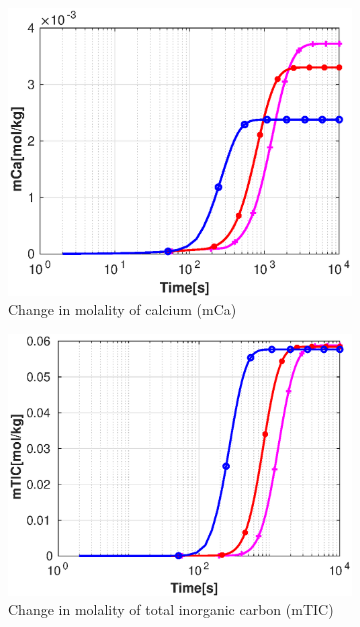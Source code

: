 \begin{figure}[!h]
\begin{subfigure}{.5\linewidth}
        \includegraphics[width=\textwidth]{PICTURES/with_vel_mCa.eps}
        \caption{Change in molality of calcium (mCa)}
        \label{fig:velmCa}       %
    \end{subfigure}%
        \hfill
    \begin{subfigure}{.5\linewidth}
        \centering
        \includegraphics[width=\textwidth]{PICTURES/with_vel_mTIC.eps}
        \caption{Change in molality of total inorganic carbon (mTIC)}
        \label{fig:velmTIC}
    \end{subfigure}%
    \hfill
    \begin{subfigure}{.5\linewidth}

\end{subfigure}
\end{figure}
